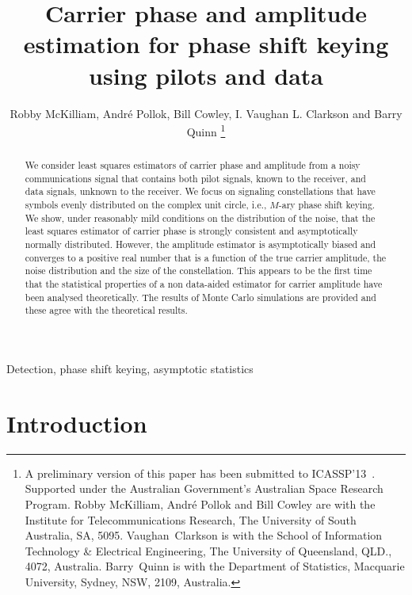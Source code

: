 \documentclass[journal]{IEEEtran}
\title{Carrier phase and amplitude estimation for phase shift keying using pilots and data}
\author{Robby McKilliam, Andr\'{e} Pollok, Bill Cowley, I. Vaughan L. Clarkson and Barry Quinn  
\thanks{
A preliminary version of this paper has been submitted to ICASSP'13~\cite{McKilliam_leastsqPSKnoncoICASSP_2012}.  Supported under the Australian Government’s Australian Space Research Program.
Robby McKilliam, Andr\'{e} Pollok and Bill Cowley are with the Institute for Telecommunications Research, The University of South Australia, SA, 5095.  Vaughan~Clarkson is with the School of Information Technology \& Electrical Engineering, The University of Queensland, QLD., 4072, Australia.  Barry~Quinn is with the Department of Statistics, Macquarie University, Sydney, NSW, 2109, Australia.
}}
\begin{document}
\maketitle

\begin{abstract}
We consider least squares estimators of carrier phase and amplitude from a noisy communications signal that contains both pilot signals, known to the receiver, and data signals, unknown to the receiver.  We focus on signaling constellations that have symbols evenly distributed on the complex unit circle, i.e., $M$-ary phase shift keying.  We show, under reasonably mild conditions on the distribution of the noise, that the least squares estimator of carrier phase is strongly consistent and asymptotically normally distributed.  However, the amplitude estimator is asymptotically biased and converges to a positive real number that is a function of the true carrier amplitude, the noise distribution and the size of the constellation.  
This appears to be the first time that the statistical properties of a non data-aided estimator for carrier amplitude have been analysed theoretically.
The results of Monte Carlo simulations are provided and these agree with the theoretical results.   
\end{abstract}
\begin{IEEEkeywords}
Detection, phase shift keying, asymptotic statistics
\end{IEEEkeywords}

\section{Introduction}
\end{document}
